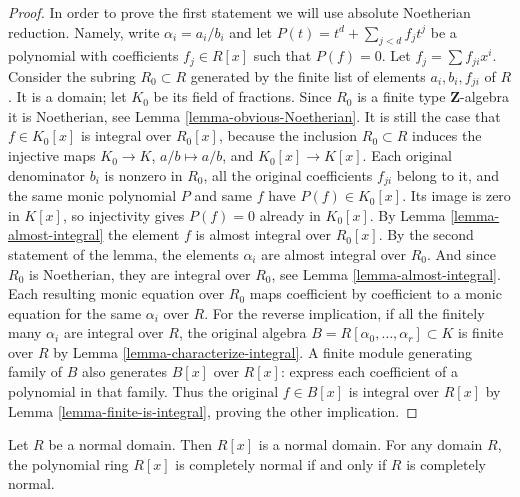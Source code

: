 \begin{proof}
\medskip\noindent
In order to prove the first statement we will use absolute Noetherian
reduction. Namely, write $\alpha_i = a_i / b_i$ and
let $P(t) = t^d + \sum_{j < d} f_j t^j$ be a polynomial
with coefficients $f_j \in R[x]$ such that $P(f) = 0$.
Let $f_j = \sum f_{ji}x^i$. Consider the subring
$R_0 \subset R$ generated by the finite list of elements
$a_i, b_i, f_{ji}$ of $R$. It is a domain; let
$K_0$ be its field of fractions. Since $R_0$ is a finite type
$\mathbf{Z}$-algebra it is Noetherian, see
Lemma \ref{lemma-obvious-Noetherian}. It is still
the case that $f \in K_0[x]$ is integral over $R_0[x]$,
because the inclusion $R_0\subset R$ induces the injective maps
$K_0\to K$, $a/b\mapsto a/b$, and $K_0[x]\to K[x]$.
Each original denominator $b_i$ is nonzero in $R_0$, all the
original coefficients $f_{ji}$ belong to it, and the same monic
polynomial $P$ and same $f$ have $P(f)\in K_0[x]$.
Its image is zero in $K[x]$, so injectivity gives $P(f)=0$
already in $K_0[x]$.
By Lemma \ref{lemma-almost-integral} the element
$f$ is almost integral over $R_0[x]$. By the second statement of
the lemma, the elements $\alpha_i$ are almost integral
over $R_0$. And since $R_0$ is Noetherian, they are
integral over $R_0$, see Lemma \ref{lemma-almost-integral}.
Each resulting monic equation over $R_0$ maps coefficient by
coefficient to a monic equation for the same $\alpha_i$ over $R$.
For the reverse implication, if all the finitely many $\alpha_i$
are integral over $R$, the original algebra
$B=R[\alpha_0,\ldots,\alpha_r]\subset K$ is finite over $R$
by Lemma \ref{lemma-characterize-integral}. A finite module
generating family of $B$ also generates $B[x]$ over $R[x]$:
express each coefficient of a polynomial in that family.
Thus the original $f\in B[x]$ is integral over $R[x]$ by
Lemma \ref{lemma-finite-is-integral}, proving the other implication.
\end{proof}

\begin{lemma}
\label{lemma-polynomial-domain-normal}
Let $R$ be a normal domain.
Then $R[x]$ is a normal domain. For any domain $R$, the polynomial
ring $R[x]$ is completely normal if and only if $R$ is completely normal.
\end{lemma}

